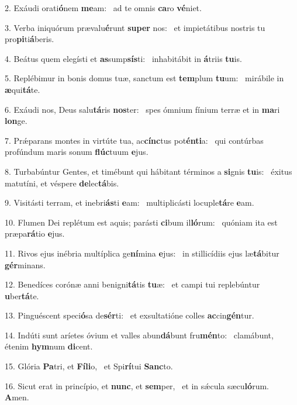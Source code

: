 2. Exáudi orati\textbf{ó}nem \textbf{me}am: \ast\  ad te omnis \textbf{ca}ro \textbf{vé}niet.\

3. Verba iniquórum prævalu\textbf{é}runt \textbf{su}\textbf{per} nos: \ast\  et impietátibus nostris tu pro\textbf{pi}ti\textbf{á}beris.\

4. Beátus quem elegísti et \textbf{as}sump\textbf{sís}ti: \ast\  inhabitábit in \textbf{á}triis \textbf{tu}is.\

5. Replébimur in bonis domus tuæ, sanctum est \textbf{tem}plum \textbf{tu}um: \ast\  mirábile in \textbf{æ}qui\textbf{tá}te.\

6. Exáudi nos, Deus salu\textbf{tá}ris \textbf{nos}ter: \ast\  spes ómnium fínium terræ et in \textbf{ma}ri \textbf{lon}ge.\

7. Prǽparans montes in virtúte tua, ac\textbf{cínc}tus pot\textbf{én}\textbf{ti}a: \ast\  qui contúrbas profúndum maris sonum \textbf{flúc}tuum \textbf{e}jus.\

8. Turbabúntur Gentes, et timébunt qui hábitant términos a \textbf{si}gnis \textbf{tu}is: \ast\  éxitus matutíni, et véspere \textbf{de}lec\textbf{tá}bis.\

9. Visitásti terram, et inebri\textbf{ás}ti \textbf{e}am: \ast\  multiplicásti locuple\textbf{tá}re \textbf{e}am.\

10. Flumen Dei replétum est aquis; parásti \textbf{ci}bum il\textbf{ló}rum: \ast\  quóniam ita est præpa\textbf{rá}tio \textbf{e}jus.\

11. Rivos ejus inébria multíplica ge\textbf{ní}mina \textbf{e}jus: \ast\  in stillicídiis ejus læ\textbf{tá}bitur \textbf{gér}minans.\

12. Benedíces corónæ anni benigni\textbf{tá}tis \textbf{tu}æ: \ast\  et campi tui replebúntur \textbf{u}ber\textbf{tá}te.\

13. Pinguéscent speci\textbf{ó}sa de\textbf{sér}ti: \ast\  et exsultatióne colles \textbf{ac}cin\textbf{gén}tur.\

14. Indúti sunt aríetes óvium et valles abun\textbf{dá}bunt fru\textbf{mén}to: \ast\  clamábunt, étenim \textbf{hym}num \textbf{di}cent.\

15. Glória \textbf{Pa}tri, et \textbf{Fí}\textbf{li}o, \ast\  et Spi\textbf{rí}tui \textbf{Sanc}to.\

16. Sicut erat in princípio, et \textbf{nunc}, et \textbf{sem}per, \ast\  et in sǽcula sæcu\textbf{ló}rum. \textbf{A}men.\

